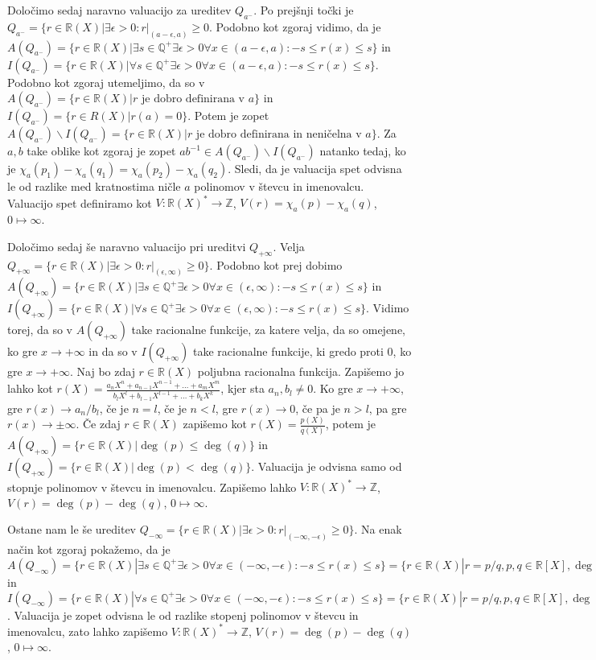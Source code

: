\documentclass[a4paper, 12pt]{article}
\newcommand{\Z}{\mathbb{Z}}
\newcommand{\Q}{\mathbb{Q}}
\newcommand{\R}{\mathbb{R}}
\begin{document}
\begin{enumerate}
Določimo sedaj naravno valuacijo za ureditev $Q_{a^-}$. Po prejšnji točki je $Q_{a^-} = \{r\in \R(X)| \exists \epsilon > 0: r|_{(a-\epsilon,a)}\ge 0$. Podobno kot zgoraj vidimo, da je $A(Q_{a^-}) = \{r\in \R(X)| \exists s\in \Q^+ \exists \epsilon > 0 \forall x \in (a-\epsilon, a): -s \le r(x) \le s\}$ in $I(Q_{a^-}) = \{r\in \R(X)| \forall s\in \Q^+ \exists \epsilon > 0 \forall x \in (a-\epsilon, a): -s \le r(x) \le s\}$. Podobno kot zgoraj utemeljimo, da so v $A(Q_{a^-}) = \{r\in \R(X)| r \text{ je dobro definirana v } a\}$ in $I(Q_{a^-}) = \{r\in R(X)| r(a) = 0\}$. Potem je zopet $A(Q_{a^-}) \smallsetminus I(Q_{a^-}) = \{r\in \R(X)| r \text{ je dobro definirana in neničelna v } a \}$. Za $a,b$ take oblike kot zgoraj je zopet $ab^{-1} \in A(Q_{a^-}) \smallsetminus I(Q_{a^-})$ natanko tedaj, ko je $\chi_a(p_1) - \chi_a(q_1) = \chi_a(p_2) - \chi_a(q_2)$. Sledi, da je valuacija spet odvisna le od razlike med kratnostima ničle $a$ polinomov v števcu in imenovalcu. Valuacijo spet definiramo kot $V:\R(X)^* \rightarrow \Z$, $V(r) = \chi_a(p) - \chi_a(q)$, $0\mapsto \infty$.

Določimo sedaj še naravno valuacijo pri ureditvi $Q_{+\infty}$. Velja $Q_{+\infty} = \{r\in \R(X)| \exists \epsilon > 0: r|_{(\epsilon, \infty)} \ge 0\}$. Podobno kot prej dobimo $A(Q_{+\infty}) = \{r\in \R(X)| \exists s\in \Q^+ \exists \epsilon > 0 \forall x \in (\epsilon, \infty): - s \le r(x) \le s\}$ in $I(Q_{+\infty}) =  \{r\in \R(X)| \forall s\in \Q^+ \exists \epsilon > 0 \forall x \in (\epsilon, \infty): - s \le r(x) \le s\}$. Vidimo torej, da so v $A(Q_{+\infty})$ take racionalne funkcije, za katere velja, da so omejene, ko gre $x\rightarrow +\infty$ in da so v $I(Q_{+\infty})$ take racionalne funkcije, ki gredo proti 0, ko gre $x\rightarrow + \infty$. Naj bo zdaj $r\in \R(X)$ poljubna racionalna funkcija. Zapišemo jo lahko kot $r(X) = \frac{a_n X^n + a_{n-1} X^{n-1} + \dots + a_m X^m}{b_l X^l + b_{l-1} X^{l-1} + \dots + b_k X^k}$, kjer sta $a_n , b_l \neq 0$. Ko gre $x\rightarrow +\infty$, gre $r(x) \rightarrow a_n/b_l$, če je $n=l$, če je $n<l$, gre $r(x) \rightarrow 0$, če pa je $n> l$, pa gre $r(x) \rightarrow  \pm \infty$. Če zdaj $r\in \R(X)$ zapišemo kot $r(X) = \frac{p(X)}{q(X)}$, potem je $A(Q_{+\infty}) = \{r \in \R(X)| \deg(p) \le \deg(q)\}$ in $I(Q_{+\infty}) = \{r \in \R(X)| \deg(p) < \deg(q)\}$. Valuacija je odvisna samo od stopnje polinomov v števcu in imenovalcu. Zapišemo lahko $V:\R(X)^* \rightarrow \Z$, $V(r) = \deg(p) - \deg(q)$, $0\mapsto \infty$.

Ostane nam le še ureditev $Q_{-\infty} = \{r\in \R(X)|\exists \epsilon > 0: r|_{(-\infty,-\epsilon)} \ge 0\}$. Na enak način kot zgoraj pokažemo, da je $A(Q_{-\infty}) = \{r\in \R(X)| \exists s\in \Q^+ \exists \epsilon > 0\forall x\in (-\infty, -\epsilon): -s \le r(x) \le s\} = \{r\in \R(X)| r = p/q, p,q \in \R[X], \deg(p) \le \deg(q)\}$ in $I(Q_{-\infty}) = \{r\in \R(X)| \forall s\in \Q^+ \exists \epsilon > 0\forall x\in (-\infty, -\epsilon): -s \le r(x) \le s\} = \{r\in \R(X)| r = p/q, p,q \in \R[X], \deg(p) < \deg(q)\}$. Valuacija je zopet odvisna le od razlike stopenj polinomov v števcu in imenovalcu, zato lahko zapišemo $V: \R(X)^* \rightarrow \Z$, $V(r) = \deg(p) - \deg(q)$, $0\mapsto \infty$.


\end{enumerate}
\end{document}
